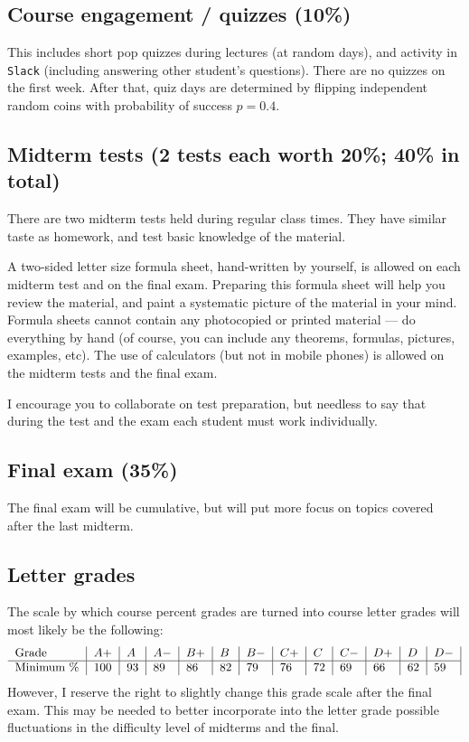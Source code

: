 \documentclass[oneside,11pt]{amsart}
\begin{document}
\subsection{Course engagement / quizzes (10\%)}

This includes short pop quizzes during lectures (at random days), 
and activity in \texttt{Slack} (including answering other student's questions).
There are no quizzes on the first week.
After that,
quiz days are determined by flipping independent random coins with 
probability of success $p=0.4$. 

\subsection{Midterm tests (2 tests each worth 20\%; 40\% in total)}

There are two midterm tests
held
during regular class times.
They have
similar taste as homework, and test basic knowledge of the material.

A two-sided letter size formula sheet, hand-written by yourself, is
allowed on each midterm test and on the final exam. Preparing this formula sheet
will help you review the material, and paint a systematic picture of the material in your mind.
Formula sheets cannot contain any photocopied or printed material
--- do everything by hand (of course, you can include any theorems, formulas, pictures, 
examples, etc).
The use of calculators (but not in mobile phones)
is allowed on the midterm tests and the final exam.

I encourage you to collaborate on test preparation, but needless to say that
during the test and the exam each student must work individually.

\subsection{Final exam (35\%)}

The final exam will be cumulative, but will put more focus 
on topics covered after the last midterm.

\subsection*{Letter grades}

The scale by which course percent grades are turned into course letter grades
will most likely be the following:
\begin{equation*}
	\begin{tabular}{l|l|l|l|l|l|l|l|l|l|l|l|l|}
		Grade      & $ A+	$ & $A	$ & $A-	$ & $B+	$ & $B	$ & $B-	$ & $C+	$ & $C	$ & $C-	$ & $D+	$ & $D	$ & $D-$ \\
		\hline
		Minimum \% & 100     & 93   & 89    & 86    & 82    & 79    & 76    & 72    & 69    & 66    & 62    & 59
	\end{tabular}
\end{equation*}
However, I reserve the right to slightly change this grade scale after the
final exam.
This may be needed
to better incorporate into the letter grade
possible fluctuations in the difficulty level of 
midterms and the final.
\end{document}
